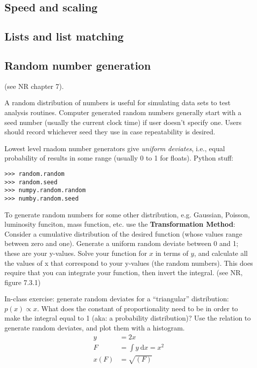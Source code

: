 \documentclass[12pt]{article}
\begin{document}
\subsection{Speed and scaling}
\subsection{Lists and list matching}
\subsection{Random number generation}
(see NR chapter 7).

A random distribution of numbers is useful for simulating data sets to test
analysis routines. Computer generated random numbers generally start with a seed
number (usually the current clock time) if user doesn't specify one. Users should
record whichever seed they use in case repeatability is desired.

Lowest level rnadom number generators give \emph{uniform deviates}, i.e., equal
probability of results in some range (usually 0 to 1 for floats).
Python stuff:

\begin{verbatim}
>>> random.random
>>> random.seed
>>> numpy.random.random
>>> numby.random.seed
\end{verbatim}

To generate random numbers for some other distribution, e.g. Gaussian, Poisson,
luminosity funciton, mass function, etc. use the \textbf{Transformation Method}:
Consider a cumulative distribution of the desired function (whose values range
between zero and one). Generate a uniform random deviate between 0 and 1; these
are your y-values. Solve your function for $x$ in terms of $y$, and calculate
all the values of x that correspond to your y-values (the random numbers). This
does require that you can integrate your function, then invert the integral.
(see NR, figure 7.3.1)

In-class exercise: generate random deviates for a ``triangular'' distribution:
$p(x) \propto x$. What does the constant of proportionality need to be in order
to make the integral equal to 1 (aka: a probability distribution)? Use the
relation to generate random deviates, and plot them with a histogram.
\begin{align*}
    y &= 2x \\
    F &= \int \! y \ \mathrm{d}x = x^2\\
    x(F) &= \sqrt{(F)} \\
\end{align*}
\end{document}
